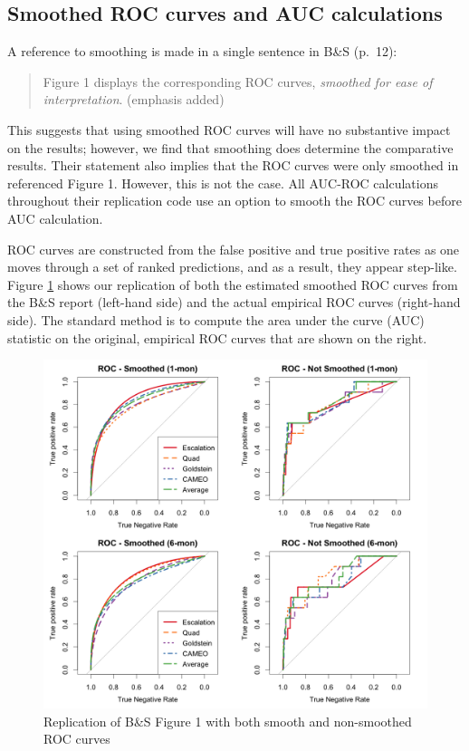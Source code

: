 \documentclass[
]{article}
\begin{document}
\hypertarget{smoothed-roc-curves-and-auc-calculations}{%
\subsection{Smoothed ROC curves and AUC calculations}\label{smoothed-roc-curves-and-auc-calculations}}

A reference to smoothing is made in a single sentence in B\&S (p.~12):

\begin{quote}
Figure 1 displays the corresponding ROC curves, \emph{smoothed for ease of interpretation}. (emphasis added)
\end{quote}

This suggests that using smoothed ROC curves will have no substantive impact on the results; however, we find that smoothing does determine the comparative results. Their statement also implies that the ROC curves were only smoothed in referenced Figure 1. However, this is not the case. All AUC-ROC calculations throughout their replication code use an option to smooth the ROC curves before AUC calculation.

ROC curves are constructed from the false positive and true positive rates as one moves through a set of ranked predictions, and as a result, they appear step-like. Figure \ref{fig:rocs} shows our replication of both the estimated smoothed ROC curves from the B\&S report (left-hand side) and the actual empirical ROC curves (right-hand side). The standard method is to compute the area under the curve (AUC) statistic on the original, empirical ROC curves that are shown on the right.

\begin{figure}
\caption{Replication of B\&S Figure 1 with both smooth and non-smoothed ROC curves\label{fig:rocs}}
\centering
\includegraphics[width=.95\linewidth]{figures/fig-1-figure1-replicated.png}
\end{figure}
\end{document}
